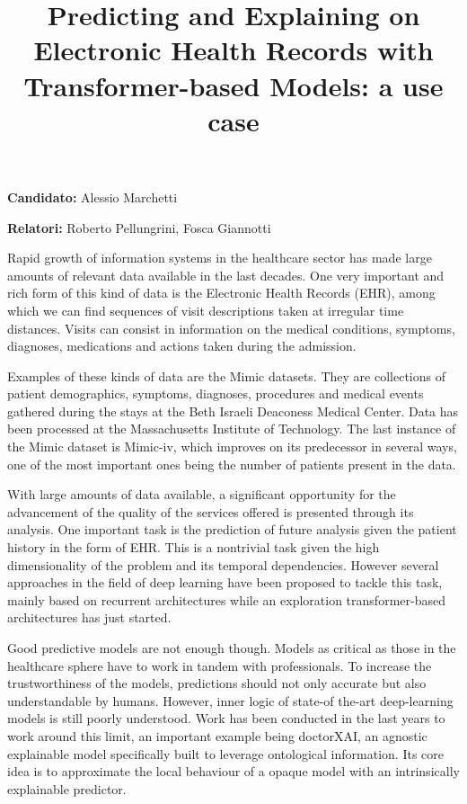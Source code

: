 \documentclass[]{marticle}
\title{\textbf{\huge Predicting and Explaining on Electronic Health Records  with Transformer-based Models: a use case}}
\date{}
\author{}
\begin{document}
\maketitle

\textbf{Candidato:} Alessio Marchetti

\textbf{Relatori:} Roberto Pellungrini, Fosca Giannotti

Rapid growth of information systems in the healthcare sector has made large amounts of relevant data
available in the last decades. One very important and rich form of this kind of data is the
Electronic Health Records (EHR), among which we can find sequences of visit descriptions taken at
irregular time distances. Visits can consist in information on the medical conditions, symptoms,
diagnoses, medications and actions taken during the admission. 

Examples of these kinds of data are the Mimic datasets. They are collections of patient
demographics, symptoms, diagnoses, procedures and medical events gathered during the stays at the
Beth Israeli Deaconess Medical Center. Data has been processed at the Massachusetts Institute of
Technology. The last instance of the Mimic dataset is Mimic-iv, which improves on its predecessor in
several ways, one of the most important ones being the number of patients present in the data.

With large amounts of data available, a significant opportunity for the advancement of the quality
of the services offered is presented through its analysis. One important task is the prediction of
future analysis given the patient history in the form of EHR. This is a nontrivial task given the
high dimensionality of the problem and its temporal dependencies. However several approaches in the
field of deep learning have been proposed to tackle this task, mainly based on recurrent
architectures while an exploration transformer-based architectures has just started.

Good predictive models are not enough though. Models as critical as those in the healthcare sphere
have to work in tandem with professionals. To increase the trustworthiness of the models,
predictions should not only accurate but also understandable by humans. However, inner logic of
state-of the-art deep-learning models is still poorly understood. Work has been conducted in the
last years to work around this limit, an important example being doctorXAI, an agnostic explainable
model specifically built to leverage ontological information. Its core idea is to approximate the
local behaviour of a opaque model with an intrinsically explainable predictor.
\end{document}
